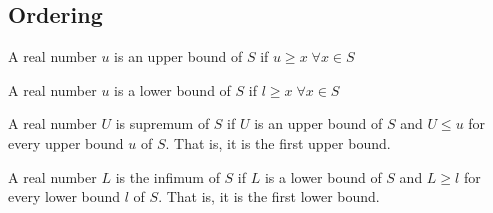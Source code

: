 \documentclass[a4paper]{article}
\theoremstyle{plain}
\theoremstyle{definition}
\newtheorem{defn}{Definition}[section]
\theoremstyle{remark}
\begin{document}
\subsection{Ordering}
\begin{tcolorbox}[colback=black!3!white,colframe=black!60!white,title=\begin{defn}Upper bound \label{Upper bound}\end{defn}]
A real number $u$ is an upper bound of $S$ if $u \ge x \; \forall x \in S$
\end{tcolorbox}
\begin{tcolorbox}[colback=black!3!white,colframe=black!60!white,title=\begin{defn}Lower bound \label{Lower bound}\end{defn}]
A real number $u$ is a lower bound of $S$ if $l \ge x \; \forall x \in S$
\end{tcolorbox}
\begin{tcolorbox}[colback=black!3!white,colframe=black!60!white,title=\begin{defn}Supremum \label{Supremum}\end{defn}]
A real number $U$ is supremum of $S$ if $ U$ is an upper bound of $S$ and $U\le u$ for every upper bound $u$ of $S$. That is, it is the first upper bound.
\end{tcolorbox}
\begin{tcolorbox}[colback=black!3!white,colframe=black!60!white,title=\begin{defn}Infimum \label{Infimum}\end{defn}]
A real number $L$ is the infimum of $S$ if $L$ is a lower bound of $S$ and $L \ge l$ for every lower bound $l$ of $S$. That is, it is the first lower bound.
\end{tcolorbox}
\end{document}
